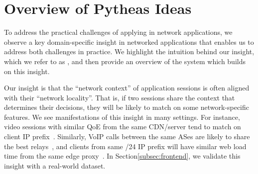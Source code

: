 \section{Overview of Pytheas Ideas}
\label{sec:pytheas:overview}

To address the practical challenges of applying \mab in network applications, 
we observe a key domain-specific insight in networked applications
 that enables us to address both challenges in practice. We highlight the intuition 
 behind our insight, which we refer to as \idea, and then provide an overview of the \name system 
 which builds on this insight.  


Our insight is that the ``network context'' of application sessions is often aligned with
their ``network locality''.
That is, if two sessions share the context that determines their \mab decisions, 
they will be likely to match on some network-specific features.
We see manifestations of this insight in many settings.
 For instance, video
sessions with similar QoE from the same CDN/server tend to match on 
client IP prefix~\cite{cfa,cs2p}. 
Similarly, VoIP calls between the same ASes are likely to share the best
relays~\cite{via},  and clients from  same /24 IP prefix will have
similar web load time from the same edge proxy~\cite{footprint}.
In Section\ref{subsec:frontend}, we validate this insight with a real-world dataset.

%
%
%
%


